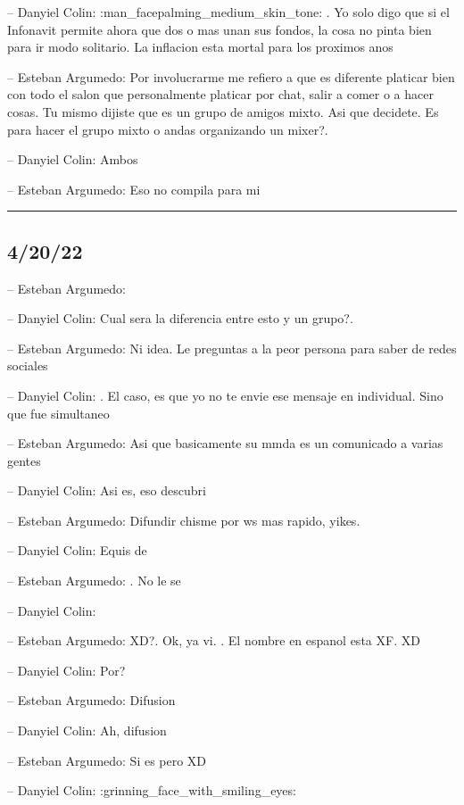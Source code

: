 -- Danyiel Colin: :man\_facepalming\_medium\_skin\_tone: . Yo solo digo
que si el Infonavit permite ahora que dos o mas unan sus fondos, la cosa
no pinta bien para ir modo solitario. La inflacion esta mortal para los
proximos anos

-- Esteban Argumedo: Por involucrarme me refiero a que es diferente
platicar bien con todo el salon que personalmente platicar por chat,
salir a comer o a hacer cosas. Tu mismo dijiste que es un grupo de
amigos mixto. Asi que decidete. Es para hacer el grupo mixto o andas
organizando un mixer?.

-- Danyiel Colin: Ambos

-- Esteban Argumedo: Eso no compila para mi

\begin{center}\rule{0.5\linewidth}{0.5pt}\end{center}

\hypertarget{section-58}{%
\subsection{4/20/22}\label{section-58}}

-- Esteban Argumedo:

-- Danyiel Colin: Cual sera la diferencia entre esto y un grupo?.

-- Esteban Argumedo: Ni idea. Le preguntas a la peor persona para saber
de redes sociales

-- Danyiel Colin: . El caso, es que yo no te envie ese mensaje en
individual. Sino que fue simultaneo

-- Esteban Argumedo: Asi que basicamente su mmda es un comunicado a
varias gentes

-- Danyiel Colin: Asi es, eso descubri

-- Esteban Argumedo: Difundir chisme por ws mas rapido, yikes.

-- Danyiel Colin: Equis de

-- Esteban Argumedo: . No le se

-- Danyiel Colin:

-- Esteban Argumedo: XD?. Ok, ya vi. . El nombre en espanol esta XF. XD

-- Danyiel Colin: Por?

-- Esteban Argumedo: Difusion

-- Danyiel Colin: Ah, difusion

-- Esteban Argumedo: Si es pero XD

-- Danyiel Colin: :grinning\_face\_with\_smiling\_eyes:

